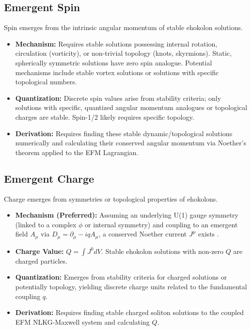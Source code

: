 \documentclass[11pt]{article}
\begin{document}
\subsection{Emergent Spin}
Spin emerges from the intrinsic angular momentum of stable ehokolon solutions.
\begin{itemize}
    \item \textbf{Mechanism: } Requires stable solutions possessing internal rotation, circulation (vorticity), or non-trivial topology (knots, skyrmions). Static, spherically symmetric solutions have zero spin analogue. Potential mechanisms include stable vortex solutions or solutions with specific topological numbers.
    \item \textbf{Quantization: } Discrete spin values arise from stability criteria; only solutions with specific, quantized angular momentum analogues or topological charges are stable. Spin-1/2 likely requires specific topology.
    \item \textbf{Derivation: } Requires finding these stable dynamic/topological solutions numerically and calculating their conserved angular momentum via Noether's theorem applied to the EFM Lagrangian.
\end{itemize}

\subsection{Emergent Charge}
Charge emerges from symmetries or topological properties of ehokolons.
\begin{itemize}
    \item \textbf{Mechanism (Preferred): } Assuming an underlying U(1) gauge symmetry (linked to a complex \(\phi\) or internal symmetry) and coupling to an emergent field \(A_\mu\) via \(D_\mu = \partial_\mu - iqA_\mu\), a conserved Noether current \(J^\mu\) exists \cite{EFM_Lagrangian_Validation}.
    \item \textbf{Charge Value: } \(Q = \int J^0 dV\). Stable ehokolon solutions with non-zero \(Q\) are charged particles.
    \item \textbf{Quantization: } Emerges from stability criteria for charged solutions or potentially topology, yielding discrete charge units related to the fundamental coupling \(q\).
    \item \textbf{Derivation: } Requires finding stable charged soliton solutions to the coupled EFM NLKG-Maxwell system and calculating \(Q\).
\end{itemize}
\end{document}

